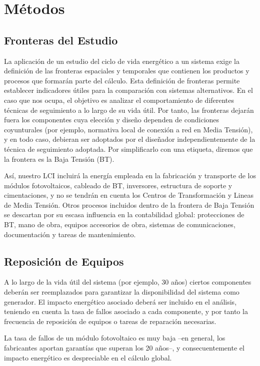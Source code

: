 \section{Métodos}


\subsection{Fronteras del Estudio}

La aplicación de un estudio del ciclo de vida energético a un sistema
exige la definición de las fronteras espaciales y temporales que
contienen los productos y procesos que formarán parte del
cálculo. Esta definición de fronteras permite establecer indicadores
útiles para la comparación con sistemas alternativos. En el caso que
nos ocupa, el objetivo es analizar el comportamiento de diferentes
técnicas de seguimiento a lo largo de su vida útil. Por tanto, las
fronteras dejarán fuera los componentes cuya elección y diseño
dependen de condiciones coyunturales (por ejemplo, normativa local de
conexión a red en Media Tensión), y en todo caso, debieran ser
adoptados por el diseñador independientemente de la técnica de
seguimiento adoptada. Por simplificarlo con una etiqueta, diremos que
la frontera es la Baja Tensión (BT). 

Así, nuestro LCI incluirá la energía empleada en la fabricación y
transporte de los módulos fotovoltaicos, cableado de BT, inversores,
estructura de soporte y cimentaciones, y no se tendrán en cuenta los
Centros de Transformación y Lineas de Media Tensión. Otros procesos
incluidos dentro de la frontera de Baja Tensión se descartan por su
escasa influencia en la contabilidad global: protecciones de BT, mano
de obra, equipos accesorios de obra, sistemas de comunicaciones,
documentación y tareas de mantenimiento.

\subsection{Reposición de Equipos}


A lo largo de la vida útil del sistema (por ejemplo, 30 años) ciertos
componentes deberán ser reemplazados para garantizar la disponibilidad
del sistema como generador. El impacto energético asociado deberá
ser incluido en el análisis, teniendo en cuenta la tasa de fallos
asociado a cada componente, y por tanto la frecuencia de reposición
de equipos o tareas de reparación necesarias. 

La tasa de fallos de un módulo fotovoltaico es muy baja --en general,
los fabricantes aportan garantías que superan los 20 años--, y
consecuentemente el impacto energético es despreciable en el cálculo
global. 

